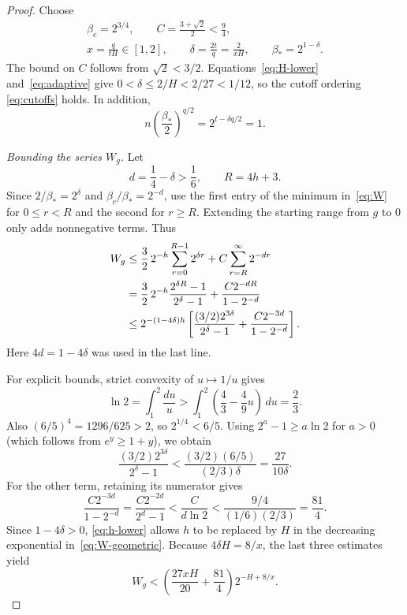 \documentclass[11pt,a4paper]{article}
\begin{document}
\begin{proof}
Choose
\begin{equation}\label{eq:adaptive}
 \begin{gathered}
 \beta_c=2^{3/4},\qquad
 C=\frac{3+\sqrt2}{2}<\frac94,\\
 x=\frac{q}{tH}\in[1,2],\qquad
 \delta=\frac{2t}{q}=\frac2{xH},\qquad
 \beta_*=2^{1-\delta}.
 \end{gathered}
\end{equation}
The bound on $C$ follows from $\sqrt2<3/2$.
Equations~\eqref{eq:H-lower} and~\eqref{eq:adaptive} give
$0<\delta\le2/H<2/27<1/12$, so the cutoff ordering
\eqref{eq:cutoffs} holds. In addition,
\begin{equation}\label{eq:exact-cancellation}
 n\left(\frac{\beta_*}{2}\right)^{q/2}
 =2^{t-\delta q/2}=1.
\end{equation}

\emph{Bounding the series $W_g$.}
Let
\[
 d=\frac14-\delta>\frac16,
 \qquad R=4h+3.
\]
Since $2/\beta_*=2^\delta$ and $\beta_c/\beta_*=2^{-d}$, use the first
entry of the minimum in~\eqref{eq:W} for $0\le r<R$ and the second
for $r\ge R$. Extending the starting range from $g$ to $0$ only adds
nonnegative terms. Thus
\begin{align}
 W_g
 &\le\frac32\,2^{-h}\sum_{r=0}^{R-1}2^{\delta r}
       +C\sum_{r=R}^{\infty}2^{-dr}\notag\\
 &=\frac32\,2^{-h}\frac{2^{\delta R}-1}{2^\delta-1}
       +\frac{C2^{-dR}}{1-2^{-d}}\notag\\
 &\le 2^{-(1-4\delta)h}
 \left[
 \frac{(3/2)2^{3\delta}}{2^\delta-1}
 +\frac{C2^{-3d}}{1-2^{-d}}
 \right].
 \label{eq:W-geometric}
\end{align}
Here $4d=1-4\delta$ was used in the last line.

For explicit bounds, strict convexity of $u\mapsto1/u$ gives
\[
 \ln2=\int_1^2\frac{du}{u}
 >\int_1^2\left(\frac43-\frac49u\right)\,du
 =\frac23.
\]
Also $(6/5)^4=1296/625>2$, so $2^{1/4}<6/5$.
Using $2^a-1\ge a\ln2$ for $a>0$ (which follows from $e^y\ge1+y$),
we obtain
\begin{equation}\label{eq:W-first-constant}
 \frac{(3/2)2^{3\delta}}{2^\delta-1}
 <\frac{(3/2)(6/5)}{(2/3)\delta}
 =\frac{27}{10\delta}.
\end{equation}
For the other term, retaining its numerator gives
\begin{equation}\label{eq:W-second-constant}
 \frac{C2^{-3d}}{1-2^{-d}}
 =\frac{C2^{-2d}}{2^d-1}
 <\frac{C}{d\ln2}
 <\frac{9/4}{(1/6)(2/3)}
 =\frac{81}{4}.
\end{equation}
Since $1-4\delta>0$, \eqref{eq:h-lower} allows $h$ to be replaced
by $H$ in the decreasing exponential in~\eqref{eq:W-geometric}.
Because $4\delta H=8/x$, the last three estimates yield
\begin{equation}\label{eq:W-final}
 W_g<
 \left(\frac{27xH}{20}+\frac{81}{4}\right)2^{-H+8/x}.
\end{equation}


\end{proof}
\end{document}
